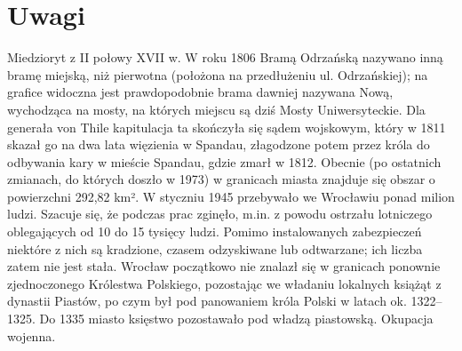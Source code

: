 \documentclass{article}
\begin{document}
\section{Uwagi}
 Miedzioryt z II połowy XVII w.\vspace{3mm}\newline 
 W roku 1806 Bramą Odrzańską nazywano inną bramę miejską, niż pierwotna (położona na przedłużeniu ul. Odrzańskiej); na grafice widoczna jest prawdopodobnie brama dawniej nazywana Nową, wychodząca na mosty, na których miejscu są dziś Mosty Uniwersyteckie.\vspace{3mm}\newline 
 Dla generała von Thile kapitulacja ta skończyła się sądem wojskowym, który w 1811 skazał go na dwa lata więzienia w Spandau, złagodzone potem przez króla do odbywania kary w mieście Spandau, gdzie zmarł w 1812.\vspace{3mm}\newline 
 Obecnie (po ostatnich zmianach, do których doszło w 1973) w granicach miasta znajduje się obszar o powierzchni 292,82 km².
 W styczniu 1945 przebywało we Wrocławiu ponad milion ludzi.\vspace{3mm}\newline 
 Szacuje się, że podczas prac zginęło, m.in. z powodu ostrzału lotniczego oblegających od 10 do 15 tysięcy ludzi.\vspace{3mm}\newline 
 Pomimo instalowanych zabezpieczeń niektóre z nich są kradzione, czasem odzyskiwane lub odtwarzane; ich liczba zatem nie jest stała.\vspace{3mm}\newline 
 Wrocław początkowo nie znalazł się w granicach ponownie zjednoczonego Królestwa Polskiego, pozostając we władaniu lokalnych książąt z dynastii Piastów, po czym był pod panowaniem króla Polski w latach ok. 1322–1325. Do 1335 miasto księstwo pozostawało pod władzą piastowską.
 Okupacja wojenna.
 
\end{document}
